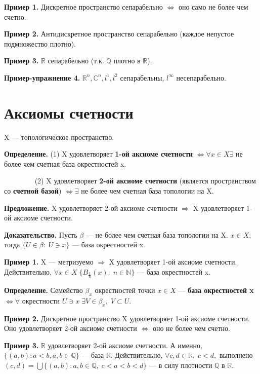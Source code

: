 \documentclass[12pt,a4paper]{article}
\begin{document}
\textbf{Пример 1.} Дискретное пространство сепарабельно $\Leftrightarrow$ оно само не более чем счетно. 

\textbf{Пример 2.} Антидискретное пространство сепарабельно (каждое непустое подмножество плотно). 

\textbf{Пример 3.} $\mathbb{R}$ сепарабельно (т.к. $\mathbb{Q}$ плотно в $\mathbb{R}$). 

\textbf{Пример-упражнение 4.} $\mathbb{R}^n, \mathbb{C}^n, l^{1}, l^{2}$ сепарабельны, $l^{\infty}$ несепарабельно. 

\section{Аксиомы счетности}

X --- топологическое пространство. 

\textbf{Определение.} (1) X удовлетворяет \textbf{1-ой аксиоме счетности} $\Leftrightarrow \forall x \in X \exists$ не более чем счетная база окрестностей x.

$\quad \quad \quad \quad$ (2) X удовлетворяет \textbf{2-ой аксиоме счетности} (является пространством со \textbf{счетной базой}) $\Leftrightarrow \exists$ не более чем счетная база топологии на X. 

\textbf{Предложение.} X удовлетворяет 2-ой аксиоме счетности $\Rightarrow$ X удовлетворяет 1-ой аксиоме счетности. 

\textbf{Доказательство.} Пусть $\beta$ --- не более чем счетная база топологии на X. $x \in X;$ тогда $\{U \in \beta: \; U \ni x\}$ --- база окрестностей x. 

\textbf{Пример 1.} X --- метризуемо $\Rightarrow$ X удовлетворяет 1-ой аксиоме счетности. Действительно, $\forall x \in X \; \{B_{\frac{1}{n}}(x): \; n \in \mathbb{N}\}$ --- база окрестностей x. 

\textbf{Определение.} Семейство $\beta_{x}$ окрестностей точки $x \in X$ --- \textbf{база окрестностей x} $\Leftrightarrow \forall$ окрестности $U \ni x \; \exists V \in \beta_{x}, \; V \subset U.$

\textbf{Пример 2.} Дискретное пространство X удовлетворяет 1-ой аксиоме счетности. Оно удовлетворяет 2-ой аксиоме счетности $\Leftrightarrow$ оно не более чем счетно. 

\textbf{Пример 3.} $\mathbb{R}$ удовлетворяет 2-ой аксиоме счетности. А именно, $\{(a, b): a < b, a, b \in \mathbb{Q}\}$ --- база $\mathbb{R}.$ Действительно, $\forall c, d \in \mathbb{R}, \; c < d,$ выполнено $(c, d) = \bigcup\{(a, b): a, b \in \mathbb{Q}, \; c < a < b < d\}$ --- в силу плотности $\mathbb{Q}$ в $\mathbb{R}.$ 
\end{document}
